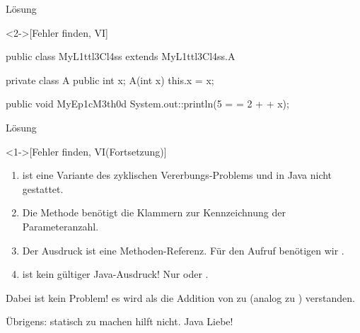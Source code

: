 \begin{frame}[c,fragile]{Lösung}
    \begin{solve}<2->[Fehler finden, VI]
        \pause{}\footnotesize\begin{plainjava}
public class MyL1ttl3Cl4ss extends MyL1ttl3Cl4ss.A {
    private class A {
        public int x;
        A(int x) { this.x = x; }
    }

    public void MyEp1cM3th0d {
        System.out::println(5 = = 2 + + x);
    }
}
        \end{plainjava}
    \end{solve}
\end{frame}

\begin{frame}[c]{Lösung}
    \addtocounter{solve}{-1}
    \begin{solve}<1->[Fehler finden, VI\hfill{}(Fortsetzung)]
        \begin{enumerate}
            \item {} ist eine Variante des zyklischen Vererbungs-Problems und in Java nicht gestattet.
            \item Die Methode  benötigt die Klammern zur Kennzeichnung der Parameteranzahl.
            \item Der Ausdruck  ist eine Methoden-Referenz. Für den Aufruf benötigen wir .
            \item \bjava[showspaces]{= =} ist kein gültiger Java-Ausdruck! Nur \bjava{==} oder \bjava{=}.
        \end{enumerate}
        \pause{}Dabei ist  kein Problem! es wird als die Addition von  zu  (analog zu ) verstanden.\smallskip\pause\par
        Übrigens:  statisch zu machen hilft nicht. Java Liebe!%
    \end{solve}
\end{frame}

\fi
